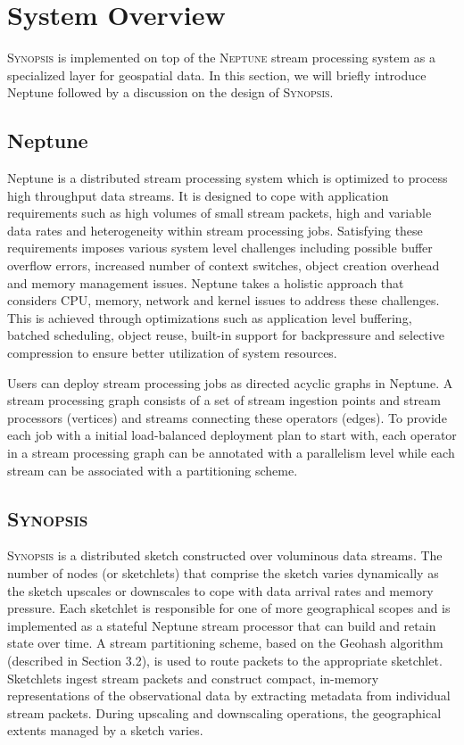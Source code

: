 \section{System Overview}
\label{sec:system}
\textsc{Synopsis} is implemented on top of the \textsc{Neptune} stream processing system \cite{buddhika2016neptune} as a specialized layer for geospatial data.
In this section, we will briefly introduce Neptune followed by a discussion on the design of \textsc{Synopsis}.

\subsection{Neptune}
Neptune is a distributed stream processing system which is optimized to process high throughput data streams.
It is designed to cope with application requirements such as high volumes of small stream packets, high and variable data rates and heterogeneity within stream processing jobs.
Satisfying these requirements imposes various system level challenges including possible buffer overflow errors, increased number of context switches, object creation overhead and memory management issues.
Neptune takes a holistic approach that considers CPU, memory, network and kernel issues to address these challenges.
This is achieved through optimizations such as application level buffering, batched scheduling, object reuse, built-in support for backpressure and selective compression to ensure better utilization of system resources.

Users can deploy stream processing jobs as directed acyclic graphs in Neptune.
A stream processing graph consists of a set of stream ingestion points and stream processors (vertices) and streams connecting these operators (edges).
To provide each job with a initial load-balanced deployment plan to start with, each operator in a stream processing graph can be annotated with a parallelism level while each stream can be associated with a partitioning scheme.

\subsection{\textsc{Synopsis}}
\textsc{Synopsis} is a distributed sketch constructed over voluminous data streams.
The number of nodes (or sketchlets) that comprise the sketch varies dynamically as the sketch upscales or downscales to cope with data arrival rates and memory pressure.
Each sketchlet is responsible for one of more geographical scopes and is implemented as a stateful Neptune stream processor that can build and retain state over time.
A stream partitioning scheme, based on the Geohash algorithm (described in Section 3.2), is used to route packets to the appropriate sketchlet.
Sketchlets ingest stream packets and construct compact, in-memory representations of the observational data by extracting metadata from individual stream packets.
During upscaling and downscaling operations, the geographical extents managed by a sketch varies.

